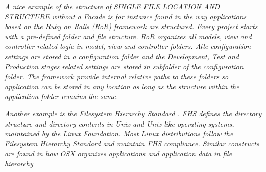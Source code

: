 \textit{A nice example of the structure of SINGLE FILE LOCATION AND STRUCTURE 
 without a {\sc Facade} is for instance found in the way applications based on the Ruby on Rails (RoR) framework \cite{Rails} are structured. Every project starts with a pre-defined folder and file structure. RoR organizes all models, view and controller related logic in model, view and controller folders. Alle configuration settings are stored in a configuration folder and the Development, Test and Production stages related settings are stored in subfolder of the configuration folder. The framework provide internal relative paths to these folders so application can be stored in any location as long as the structure within the application folder remains the same.}

\textit{Another example is the Filesystem Hierarchy Standard \cite{FHS}. FHS defines the directory structure and directory contents in Unix and Unix-like operating systems, maintained by the Linux Foundation. Most Linux distributions follow the Filesystem Hierarchy Standard and maintain FHS compliance. Similar constructs are found in how OSX organizes applications and application data in file hierarchy}
